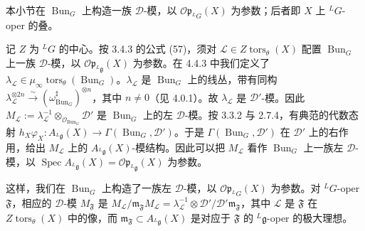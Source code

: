 


 本小节在 $\operatorname{Bun}_G$ 上构造一族 $\mathcal{D}$-模，以 $\mathcal{O}\mathfrak{p}_{{}^{L}G}(X)$ 为参数；后者即 $X$ 上 ${}^{L}G$-oper 的叠。

记 $Z$ 为 ${}^{L}G$ 的中心。按 3.4.3 的公式 (57)，须对 $\mathcal{L}\in Z\operatorname{tors}_\theta(X)$ 配置 $\operatorname{Bun}_G$ 上一族 $\mathcal{D}$-模，以 $\mathcal{O}\mathfrak{p}_{{}^{L}\mathfrak{g}}(X)$ 为参数。在 4.4.3 中我们定义了 $\lambda_{\mathcal{L}}\in\mu_\infty\operatorname{tors}_\theta(\operatorname{Bun}_G)$。$\lambda_{\mathcal{L}}$ 是 $\operatorname{Bun}_G$ 上的线丛，带有同构 $\lambda_{\mathcal{L}}^{\otimes 2n}\xrightarrow{\sim}(\omega^{\sharp}_{\operatorname{Bun}_G})^{\otimes n}$，其中 $n\ne 0$（见 4.0.1）。故 $\lambda_{\mathcal{L}}$ 是 $\mathcal{D}'$-模。因此 $M_{\mathcal{L}}:=\lambda_{\mathcal{L}}^{-1}\otimes_{\mathcal{O}_{\operatorname{Bun}_G}}\mathcal{D}'$ 是 $\operatorname{Bun}_G$ 上的左 $\mathcal{D}$-模。按 3.3.2 与 2.7.4，有典范的代数态射 $h_X\varphi_X:A_{{}^{L}\mathfrak{g}}(X)\to\Gamma(\operatorname{Bun}_G,\mathcal{D}')$。于是 $\Gamma(\operatorname{Bun}_G,\mathcal{D}')$ 在 $\mathcal{D}'$ 上的右作用，给出 $M_{\mathcal{L}}$ 上的 $A_{{}^{L}\mathfrak{g}}(X)$-模结构。因此可以把 $M_{\mathcal{L}}$ 看作 $\operatorname{Bun}_G$ 上一族左 $\mathcal{D}$-模，以 $\operatorname{Spec}A_{{}^{L}\mathfrak{g}}(X)=\mathcal{O}\mathfrak{p}_{{}^{L}\mathfrak{g}}(X)$ 为参数。

这样，我们在 $\operatorname{Bun}_G$ 上构造了一族左 $\mathcal{D}$-模，以 $\mathcal{O}\mathfrak{p}_{{}^{L}G}(X)$ 为参数。对 ${}^{L}G$-oper $\mathfrak{F}$，相应的 $\mathcal{D}$-模 $M_{\mathfrak{F}}$ 是 $M_{\mathcal{L}}/\mathfrak{m}_{\mathfrak{F}}M_{\mathcal{L}}=\lambda_{\mathcal{L}}^{-1}\otimes\mathcal{D}'/\mathcal{D}'\mathfrak{m}_{\mathfrak{F}}$，其中 $\mathcal{L}$ 是 $\mathfrak{F}$ 在 $Z\operatorname{tors}_\theta(X)$ 中的像，而 $\mathfrak{m}_{\mathfrak{F}}\subset A_{{}^{L}\mathfrak{g}}(X)$ 是对应于 $\mathfrak{F}$ 的 ${}^{L}\mathfrak{g}$-oper 的极大理想。

